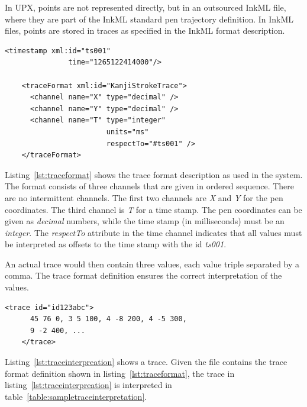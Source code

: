 In UPX, points are not represented directly, but in an outsourced InkML file,
where they are part of the InkML standard pen trajectory definition. In InkML
files, points are stored in traces as specified in the InkML format description.
\begin{xmlcode}
  \begin{lstlisting}[emph={traceFormat,channel,timestamp},
                     emphstyle=\color{blue}\textbf,
                     emph={[2]name,type,units,respectTo,id,time},
                     emphstyle={[2]\color{red}},
                     caption={Definition of the trace format},
                     label=lst:traceformat]
    <timestamp xml:id="ts001" 
               time="1265122414000"/>
                   
    <traceFormat xml:id="KanjiStrokeTrace">
      <channel name="X" type="decimal" />
      <channel name="Y" type="decimal" />
      <channel name="T" type="integer"
                        units="ms"
                        respectTo="#ts001" />
    </traceFormat>
  \end{lstlisting}
\end{xmlcode}
Listing~\ref{lst:traceformat} shows the trace format description as used in
the system. The format consists of three channels that are given in ordered 
sequence. There are no intermittent channels. The first two channels are \emph{X}
and \emph{Y} for the pen coordinates. The third channel is \emph{T} for a time 
stamp. The pen coordinates can be given as \emph{decimal} numbers, while the
time stamp (in milliseconds) must be an \emph{integer}.
The \emph{respectTo} attribute in the time channel indicates that all values
must be interpreted as offsets to the time stamp with the id \emph{ts001}.

An actual trace would then contain three values, each value triple separated by
a comma. The trace format definition ensures the correct interpretation of the 
values.
\begin{xmlcode}
  \begin{lstlisting}[emph={trace,channel},
                     emphstyle=\color{blue}\textbf,
                     emph={[2]name,type,units,respectTo,id},
                     emphstyle={[2]\color{red}},
                     caption={A sample trace},
                     label=lst:traceinterpreation]
    <trace id="id123abc">
      45 76 0, 3 5 100, 4 -8 200, 4 -5 300,
      9 -2 400, ...
    </trace>
  \end{lstlisting}
\end{xmlcode}
Listing~\ref{lst:traceinterpreation} shows a trace. Given the file contains
the trace format definition shown in listing~\ref{lst:traceformat}, the trace 
in listing~\ref{lst:traceinterpreation} is interpreted in 
table~\ref{table:sampletraceinterpretation}. 


